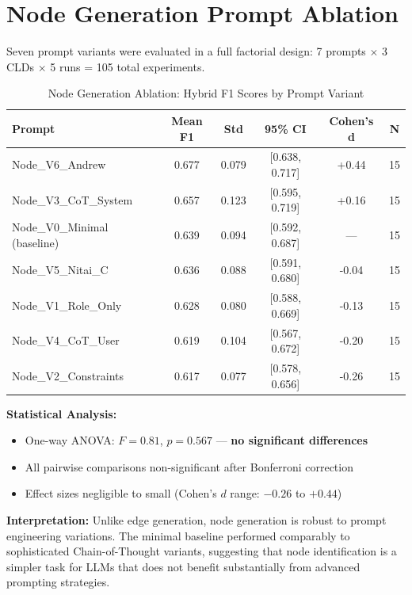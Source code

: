 \section{Node Generation Prompt Ablation}
\label{sec:ablation_node}

Seven prompt variants were evaluated in a full factorial design: 7 prompts $\times$ 3 CLDs $\times$ 5 runs = 105 total experiments.

\begin{table}[H]
\centering
\caption{Node Generation Ablation: Hybrid F1 Scores by Prompt Variant}
\label{tab:node_ablation}
\footnotesize
\begin{tabular}{@{}lccccc@{}}
\toprule
\textbf{Prompt} & \textbf{Mean F1} & \textbf{Std} & \textbf{95\% CI} & \textbf{Cohen's d} & \textbf{N} \\
\midrule
Node\_V6\_Andrew & 0.677 & 0.079 & [0.638, 0.717] & +0.44 & 15 \\
Node\_V3\_CoT\_System & 0.657 & 0.123 & [0.595, 0.719] & +0.16 & 15 \\
Node\_V0\_Minimal (baseline) & 0.639 & 0.094 & [0.592, 0.687] & --- & 15 \\
Node\_V5\_Nitai\_C & 0.636 & 0.088 & [0.591, 0.680] & -0.04 & 15 \\
Node\_V1\_Role\_Only & 0.628 & 0.080 & [0.588, 0.669] & -0.13 & 15 \\
Node\_V4\_CoT\_User & 0.619 & 0.104 & [0.567, 0.672] & -0.20 & 15 \\
Node\_V2\_Constraints & 0.617 & 0.077 & [0.578, 0.656] & -0.26 & 15 \\
\bottomrule
\end{tabular}
\end{table}

\textbf{Statistical Analysis:}
\begin{itemize}[noitemsep]
    \item One-way ANOVA: $F = 0.81$, $p = 0.567$ --- \textbf{no significant differences}
    \item All pairwise comparisons non-significant after Bonferroni correction
    \item Effect sizes negligible to small (Cohen's $d$ range: $-0.26$ to $+0.44$)
\end{itemize}

\textbf{Interpretation:} Unlike edge generation, node generation is robust to prompt engineering variations. The minimal baseline performed comparably to sophisticated Chain-of-Thought variants, suggesting that node identification is a simpler task for LLMs that does not benefit substantially from advanced prompting strategies.

